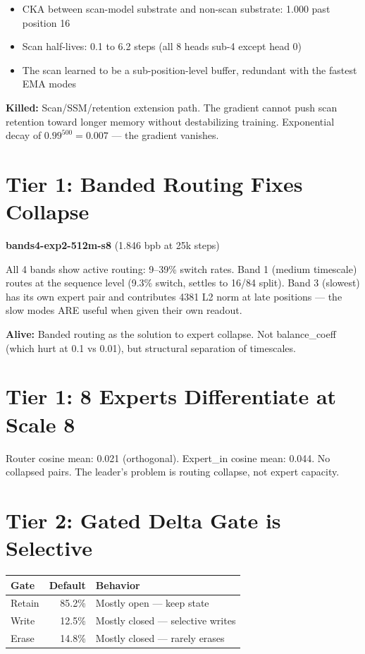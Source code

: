 \documentclass[11pt,a4paper]{report}
\newcommand{\killed}[1]{\textcolor{killed}{\textbf{Killed:}} #1}
\newcommand{\alive}[1]{\textcolor{alive}{\textbf{Alive:}} #1}
\begin{document}
\begin{itemize}[nosep]
\item CKA between scan-model substrate and non-scan substrate: 1.000 past position 16
\item Scan half-lives: 0.1 to 6.2 steps (all 8 heads sub-4 except head 0)
\item The scan learned to be a sub-position-level buffer, redundant with the fastest EMA modes
\end{itemize}

\killed{Scan/SSM/retention extension path. The gradient cannot push scan retention toward longer memory without destabilizing training. Exponential decay of $0.99^{500} = 0.007$ --- the gradient vanishes.}

\section{Tier 1: Banded Routing Fixes Collapse}

\textbf{bands4-exp2-512m-s8} (1.846 bpb at 25k steps)

All 4 bands show active routing: 9--39\% switch rates. Band 1 (medium timescale) routes at the sequence level (9.3\% switch, settles to 16/84 split). Band 3 (slowest) has its own expert pair and contributes 4381 L2 norm at late positions --- the slow modes ARE useful when given their own readout.

\alive{Banded routing as the solution to expert collapse. Not balance\_coeff (which hurt at 0.1 vs 0.01), but structural separation of timescales.}

\section{Tier 1: 8 Experts Differentiate at Scale 8}

Router cosine mean: 0.021 (orthogonal). Expert\_in cosine mean: 0.044. No collapsed pairs. The leader's problem is routing collapse, not expert capacity.

\section{Tier 2: Gated Delta Gate is Selective}

\begin{tabular}{lrl}
\toprule
\textbf{Gate} & \textbf{Default} & \textbf{Behavior} \\
\midrule
Retain & 85.2\% & Mostly open --- keep state \\
Write & 12.5\% & Mostly closed --- selective writes \\
Erase & 14.8\% & Mostly closed --- rarely erases \\
\bottomrule
\end{tabular}
\end{document}
